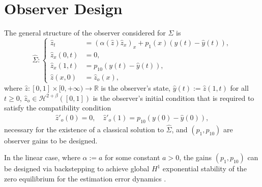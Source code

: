 \documentclass[twocolumn]{autart}
\begin{document}
\section{Observer Design}\label{observer_design}

The general structure of the observer considered for $\Sigma$ is
\begin{equation*}
\hat{\Sigma} : \left\lbrace 
\begin{aligned}
\hat{z}_t &= \left(\alpha (\hat{z})\hat{z}_x\right)_x + p_1(x)\left(y(t)-\hat{y}(t)\right), \\
\hat{z}_x(0,t) &= 0, \\
\hat{z}_x(1,t) &= p_{10}\left(y(t)-\hat{y}(t)\right), \\
\hat{z}(x,0) &= \hat{z}_o(x),
\end{aligned}
\right.
\end{equation*}
where $\hat{z}:[0,1]\times [0,+\infty)\to \mathbb{R}$ is the observer's state, $\hat{y}(t):=\hat{z}(1,t)$ for all $t\geq 0$, $\hat{z}_o\in \mathscr{H}^{2+\beta}([0,1])$ is the observer's initial condition that is required to satisfy the compatibility condition 
\begin{align}
\hat{z}'_o(0) = 0, \quad \hat{z}'_o(1) = p_{10}\left(y(0)-\hat{y}(0)\right), \label{compat2}
\end{align}
necessary for the existence of a classical solution to $\hat{\Sigma}$, and $(p_1,p_{10})$ are observer gains to be designed. 

In the linear case, where $\alpha:=a$ for some constant $a>0$, the gains $(p_1,p_{10})$ can be designed via backstepping to achieve global $H^1$ exponential stability of the zero equilibrium for the estimation error dynamics \cite{back_linear}.
\end{document}
